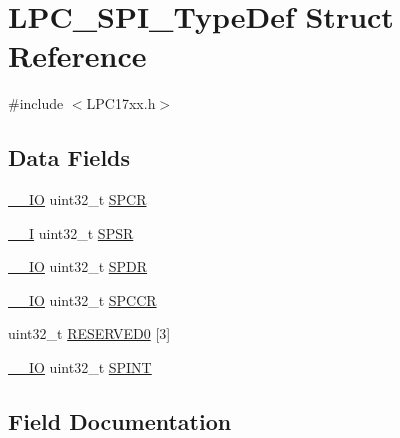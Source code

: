 \hypertarget{structLPC__SPI__TypeDef}{}\section{L\+P\+C\+\_\+\+S\+P\+I\+\_\+\+Type\+Def Struct Reference}
\label{structLPC__SPI__TypeDef}


{\ttfamily \#include $<$L\+P\+C17xx.\+h$>$}

\subsection*{Data Fields}
\begin{DoxyCompactItemize}
\item 
\hyperlink{LPC17xx_8h_aec43007d9998a0a0e01faede4133d6be}{\+\_\+\+\_\+\+IO} uint32\+\_\+t \hyperlink{structLPC__SPI__TypeDef_a2ce61227161a66342c0dce924d0321fb}{S\+P\+CR}
\item 
\hyperlink{LPC17xx_8h_af63697ed9952cc71e1225efe205f6cd3}{\+\_\+\+\_\+I} uint32\+\_\+t \hyperlink{structLPC__SPI__TypeDef_aebaf5d2e15c80b727a52076ebdfe2f03}{S\+P\+SR}
\item 
\hyperlink{LPC17xx_8h_aec43007d9998a0a0e01faede4133d6be}{\+\_\+\+\_\+\+IO} uint32\+\_\+t \hyperlink{structLPC__SPI__TypeDef_a558ae704365ae5678d2f08a4e5074ec3}{S\+P\+DR}
\item 
\hyperlink{LPC17xx_8h_aec43007d9998a0a0e01faede4133d6be}{\+\_\+\+\_\+\+IO} uint32\+\_\+t \hyperlink{structLPC__SPI__TypeDef_a1d5ce3ea68c2dfaec14d3597cdff996e}{S\+P\+C\+CR}
\item 
uint32\+\_\+t \hyperlink{structLPC__SPI__TypeDef_ab3810e1580fe80ed0b3651cf5c035ab7}{R\+E\+S\+E\+R\+V\+E\+D0} \mbox{[}3\mbox{]}
\item 
\hyperlink{LPC17xx_8h_aec43007d9998a0a0e01faede4133d6be}{\+\_\+\+\_\+\+IO} uint32\+\_\+t \hyperlink{structLPC__SPI__TypeDef_a44a40dbc05125566c6f8426daa13254a}{S\+P\+I\+NT}
\end{DoxyCompactItemize}


\subsection{Field Documentation}
